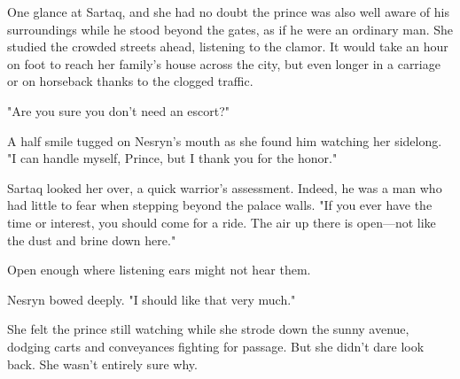 One glance at Sartaq, and she had no doubt the prince was also well aware of his surroundings while he stood beyond the gates, as if he were an ordinary man. She studied the crowded streets ahead, listening to the clamor. It would take an hour on foot to reach her family's house across the city, but even longer in a carriage or on horseback thanks to the clogged traffic.

"Are you sure you don't need an escort?"

A half smile tugged on Nesryn's mouth as she found him watching her sidelong. "I can handle myself, Prince, but I thank you for the honor."

Sartaq looked her over, a quick warrior's assessment. Indeed, he was a man who had little to fear when stepping beyond the palace walls. "If you ever have the time or interest, you should come for a ride. The air up there is open---not like the dust and brine down here."

Open enough where listening ears might not hear them.

Nesryn bowed deeply. "I should like that very much."

She felt the prince still watching while she strode down the sunny avenue, dodging carts and conveyances fighting for passage. But she didn't dare look back. She wasn't entirely sure why.

